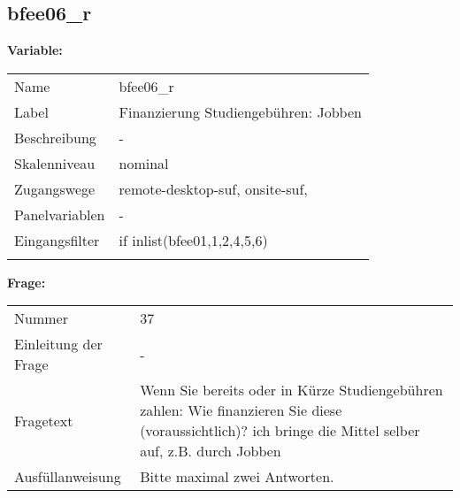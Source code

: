 	
	
	\subsection{bfee06\_r}
	\label{subSection:bfee06_r}

	\noindent\textbf{Variable:}\\
		\begin{tabular}{lL{11.3cm}}
			\label{tableVariable:bfee06_r}
			Name & bfee06\_r \\
			Label & Finanzierung Studiengebühren: Jobben \\
			Beschreibung & - \\
			Skalenniveau & nominal \\
			Zugangswege &
				remote-desktop-suf,
				onsite-suf,
 \\
			Panelvariablen & -
			 \\
			Eingangsfilter & if inlist(bfee01,1,2,4,5,6) \\
 \\
		\end{tabular}

		\vspace*{1 cm}
		\noindent\textbf{Frage:}\\
		\begin{tabular}{lL{11.3cm}}
			\label{tableQuestion:bfee06_r}
			Nummer & 37 \\
			Einleitung der Frage & - \\
			Fragetext & Wenn Sie bereits oder in Kürze Studiengebühren zahlen: Wie finanzieren Sie diese (voraussichtlich)?
ich bringe die Mittel selber auf, z.B. durch Jobben \\
			Ausfüllanweisung & Bitte maximal zwei Antworten. \\
		\end{tabular}





